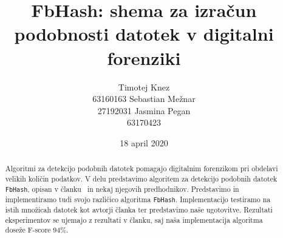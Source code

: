\documentclass{acm_proc_article-sp}
\begin{document}
\title{FbHash: shema za izračun podobnosti datotek v digitalni forenziki}

\author{
\alignauthor
Timotej Knez \\
63160163%
\alignauthor
Sebastian Mežnar\\
27192031 %
\alignauthor 
Jasmina Pegan \\
63170423%
}

\date{18 april 2020}

\maketitle
\begin{abstract}
Algoritmi za detekcijo podobnih datotek pomagajo digitalnim forenzikom pri obdelavi velikih količin podatkov. V delu predstavimo algoritem za detekcijo podobnih datotek \texttt{FbHash}, opisan v članku~\cite{fbhash} in nekaj njegovih predhodnikov. Predstavimo in implementiramo tudi svojo različico algoritma \texttt{FbHash}. Implementacijo testiramo na istih množicah datotek kot avtorji članka ter predstavimo naše ugotovitve.
Rezultati eksperimentov se ujemajo z rezultati v članku, saj naša implementacija algoritma doseže F-score 94\%.
\end{abstract}
\end{document}
